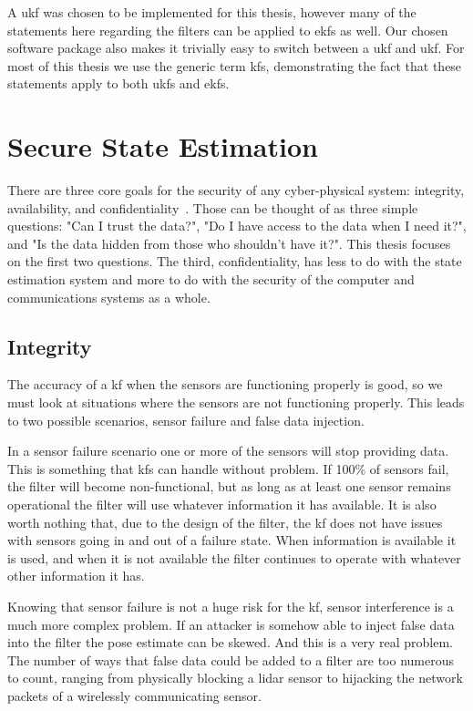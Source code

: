 \documentclass[thesis.tex]{subfile}
\begin{document}
A \gls{ukf} was chosen to be implemented for this thesis, however many of the statements here regarding the filters can be applied to \glspl{ekf} as well. Our chosen software package also makes it trivially easy to switch between a \gls{ukf} and \gls{ukf}. For most of this thesis we use the generic term \glspl{kf}, demonstrating the fact that these statements apply to both \glspl{ukf} and \glspl{ekf}.

\section{Secure State Estimation}
There are three core goals for the security of any cyber-physical system: integrity, availability, and confidentiality~\cite{Cardenas2008}. Those can be thought of as three simple questions: "Can I trust the data?", "Do I have access to the data when I need it?", and "Is the data hidden from those who shouldn't have it?". This thesis focuses on the first two questions. The third, confidentiality, has less to do with the state estimation system and more to do with the security of the computer and communications systems as a whole.

\subsection{Integrity}
The accuracy of a \gls{kf} when the sensors are functioning properly is good, so we must look at situations where the sensors are not functioning properly. This leads to two possible scenarios, sensor failure and false data injection.

In a sensor failure scenario one or more of the sensors will stop providing data. This is something that \glspl{kf} can handle without problem. If 100\% of sensors fail, the filter will become non-functional, but as long as at least one sensor remains operational the filter will use whatever information it has available. It is also worth nothing that, due to the design of the filter, the \gls{kf} does not have issues with sensors going in and out of a failure state. When information is available it is used, and when it is not available the filter continues to operate with whatever other information it has.

Knowing that sensor failure is not a huge risk for the \gls{kf}, sensor interference is a much more complex problem. If an attacker is somehow able to inject false data into the filter the pose estimate can be skewed. And this is a very real problem. The number of ways that false data could be added to a filter are too numerous to count, ranging from physically blocking a lidar sensor to hijacking the network packets of a wirelessly communicating sensor.
\end{document}
